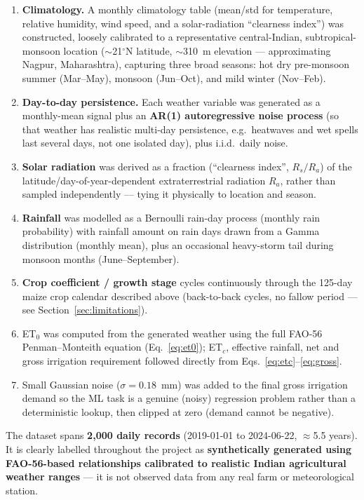 \documentclass[11pt,a4paper]{article}
\begin{document}
\begin{enumerate}[label=\arabic*.,leftmargin=2em]
    \item \textbf{Climatology.} A monthly climatology table (mean/std for
    temperature, relative humidity, wind speed, and a solar-radiation
    ``clearness index'') was constructed, loosely calibrated to a
    representative central-Indian, subtropical-monsoon location
    ($\sim$21$^\circ$N latitude, $\sim$310~m elevation --- approximating
    Nagpur, Maharashtra), capturing three broad seasons: hot dry pre-monsoon
    summer (Mar--May), monsoon (Jun--Oct), and mild winter (Nov--Feb).
    \item \textbf{Day-to-day persistence.} Each weather variable was generated
    as a monthly-mean signal plus an \textbf{AR(1) autoregressive noise
    process} (so that weather has realistic multi-day persistence, e.g.\
    heatwaves and wet spells last several days, not one isolated day), plus
    i.i.d.\ daily noise.
    \item \textbf{Solar radiation} was derived as a fraction (``clearness
    index'', $R_s/R_a$) of the latitude/day-of-year-dependent extraterrestrial
    radiation $R_a$, rather than sampled independently --- tying it physically
    to location and season.
    \item \textbf{Rainfall} was modelled as a Bernoulli rain-day process
    (monthly rain probability) with rainfall amount on rain days drawn from a
    Gamma distribution (monthly mean), plus an occasional heavy-storm tail
    during monsoon months (June--September).
    \item \textbf{Crop coefficient / growth stage} cycles continuously through
    the 125-day maize crop calendar described above (back-to-back cycles, no
    fallow period --- see Section~\ref{sec:limitations}).
    \item ET$_0$ was computed from the generated weather using the full FAO-56
    Penman--Monteith equation (Eq.~\ref{eq:et0}); ET$_c$, effective rainfall,
    net and gross irrigation requirement followed directly from
    Eqs.~\ref{eq:etc}--\ref{eq:gross}.
    \item Small Gaussian noise ($\sigma = 0.18$~mm) was added to the final
    gross irrigation demand so the ML task is a genuine (noisy) regression
    problem rather than a deterministic lookup, then clipped at zero (demand
    cannot be negative).
\end{enumerate}

The dataset spans \textbf{2{,}000 daily records} (2019-01-01 to 2024-06-22,
$\approx$5.5 years). It is clearly labelled throughout the project as
\textbf{synthetically generated using FAO-56-based relationships calibrated to
realistic Indian agricultural weather ranges} --- it is not observed data from
any real farm or meteorological station.
\end{document}
